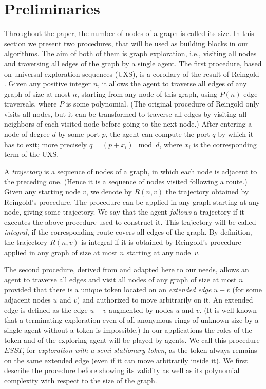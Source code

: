 \documentclass [11pt] {article}
\begin{document}
\section{Preliminaries}\label{prelim}

Throughout the paper, 
the number of nodes of a graph is called its size.
In this section we {present two procedures}, that will be used as building blocks in our algorithms. 
The aim of both of them is graph exploration, i.e., visiting all nodes and traversing all edges of the graph by a single agent. 
The first procedure, based on universal exploration sequences (UXS), is a corollary of the  result of Reingold \cite{Re}. Given any positive integer $n$, it allows the agent to traverse all edges of any graph of size at most $n$,
starting from any node of this graph, using $P(n)$ edge traversals, where $P$ is some polynomial. (The original procedure of Reingold only visits all nodes, but it can be transformed to traverse all edges by visiting all neighbors of each visited node before going to the next node.) After entering a node of degree $d$ by some port $p$,
the agent can compute the port $q$ by which it has to exit; more precisely $q=(p+x_i)\mod d$, where $x_i$ is the corresponding term of the UXS.

A {\em trajectory} is a sequence of nodes of a graph, in which each node is adjacent to the preceding one. (Hence it is a sequence of nodes visited following a route.)
Given any starting node $v$,  we denote by $R(n,v)$ the trajectory obtained by Reingold's procedure. The procedure can be applied in any graph starting at any node, giving
some trajectory. We say that  the agent {\em follows} a trajectory if it executes the above procedure used to construct it.
This trajectory will be called {\em integral}, if the corresponding route covers all edges of the graph. By definition, the trajectory $R(n,v)$ is integral if it is
obtained by Reingold's procedure applied in any graph of size at most $n$ starting at any node~$v$. 

{The second procedure, derived from \cite{DP} and adapted here to our needs, allows an agent to traverse all edges {and visit all nodes} of any graph of size at most $n$ provided that there is a {unique token located on an {\em extended edge} $u-v$ (for some adjacent nodes $u$ and $v$) and authorized to move arbitrarily on it.
An extended edge is defined as the edge $u-v$ augmented by nodes $u$ and $v$}. (It is well known that a terminating exploration even of all anonymous rings of unknown size by a single agent without a token is impossible.) 
In our applications the roles of the token and of the exploring agent will be played by agents. We call this procedure $ESST$, for {\em exploration with a semi-stationary token}, {as the token always remains on the same extended edge (even if it can move arbitrarily inside it)}. We first describe the procedure before showing its validity as well as its polynomial complexity with respect to the size of the graph.}
\end{document}
